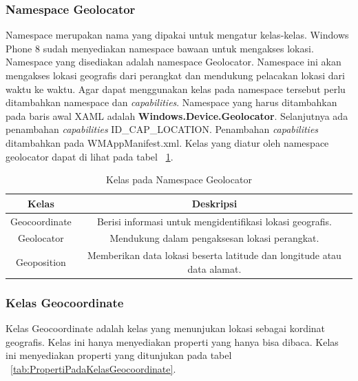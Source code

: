 \subsubsection{Namespace Geolocator}
\label{subsubsec:Namespace Geolocator}
\hspace{0.5cm} Namespace merupakan nama yang dipakai untuk mengatur kelas-kelas. Windows Phone 8 sudah menyediakan namespace bawaan untuk mengakses lokasi. Namespace yang disediakan adalah namespace Geolocator. Namespace ini akan mengakses lokasi geografis dari perangkat dan mendukung pelacakan lokasi dari waktu ke waktu. Agar dapat menggunakan kelas pada namespace tersebut perlu ditambahkan namespace dan \textit{capabilities}. Namespace yang harus ditambahkan pada baris awal XAML adalah \textbf{Windows.Device.Geolocator}. Selanjutnya ada penambahan \textit{capabilities} ID\_CAP\_LOCATION. Penambahan \textit{capabilities} ditambahkan pada WMAppManifest.xml. Kelas yang diatur oleh namespace geolocator dapat di lihat pada tabel ~\ref{tab:KelasPadaNamespaceGeolocator}.
\begin{table}[h]
	\centering
		\begin{tabular}{ |c||c|}
				\hline
				Kelas & Deskripsi \\ \hline
				Geocoordinate & Berisi informasi untuk mengidentifikasi lokasi geografis. \\ \hline
				Geolocator & Mendukung dalam pengaksesan lokasi perangkat. \\ \hline
				Geoposition & Memberikan data lokasi beserta latitude dan longitude atau data alamat. \\ \hline
				\hline
		\end{tabular}
	\caption{Kelas pada Namespace Geolocator}
	\label{tab:KelasPadaNamespaceGeolocator}
\end{table}

\subsubsection{Kelas Geocoordinate}
\label{subsubsec:Kelas Geocoordinate}
\hspace{0.5cm} Kelas Geocoordinate adalah kelas yang menunjukan lokasi sebagai kordinat geografis. Kelas ini hanya menyediakan properti yang hanya bisa dibaca. Kelas ini menyediakan properti yang ditunjukan pada tabel ~\ref{tab:PropertiPadaKelasGeocoordinate}.

